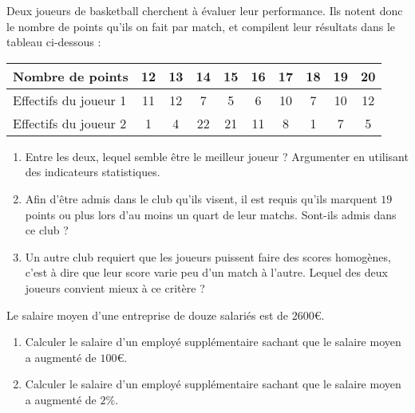 \documentclass[
	classe=$2^{de}$,
	headerTitle=Évaluation\space Chapitre\space 4
]{évaluation}
\begin{document}
\begin{exercice}[5]
	Deux joueurs de basketball cherchent à évaluer leur performance. Ils notent donc le nombre de points qu'ils on fait par match, et compilent leur résultats dans le tableau ci-dessous :

	\begin{center}
		\begin{tabular}{|l|c|c|c|c|c|c|c|c|c|}
			\hline
			Nombre de points      & 12 & 13 & 14 & 15 & 16 & 17 & 18 & 19 & 20 \tabularnewline \hline
			Effectifs du joueur 1 & 11 & 12 & 7  & 5  & 6  & 10 & 7  & 10 & 12 \tabularnewline \hline
			Effectifs du joueur 2 & 1  & 4  & 22 & 21 & 11 & 8  & 1  & 7  & 5 \tabularnewline \hline
		\end{tabular}
	\end{center}

	\begin{enumerate}
		\item Entre les deux, lequel semble être le meilleur joueur ? Argumenter en utilisant des indicateurs statistiques.
		\item Afin d'être admis dans le club qu'ils visent, il est requis qu'ils marquent $19$ points ou plus lors d'au moins un quart de leur matchs. Sont-ils admis dans ce club ?
		\item Un autre club requiert que les joueurs puissent faire des scores homogènes, c'est à dire que leur score varie peu d'un match à l'autre. Lequel des deux joueurs convient mieux à ce critère ?
	\end{enumerate}
\end{exercice}

\begin{exercice}[3]
	Le salaire moyen d'une entreprise de douze salariés est de $2600€$.
	\begin{enumerate}
		\item Calculer le salaire d’un employé supplémentaire sachant que le salaire moyen a augmenté de $100€$. 
		\item Calculer le salaire d’un employé supplémentaire sachant que le salaire moyen a augmenté de $2\%$. 
	\end{enumerate}
\end{exercice}
\end{document}
